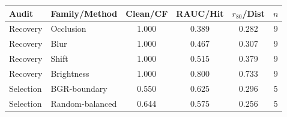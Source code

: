 \begin{tabular}{llcccc}
\hline
Audit & Family/Method & Clean/CF & RAUC/Hit & $r_{80}$/Dist & $n$ \\
\hline
Recovery & Occlusion & 1.000 & 0.389 & 0.282 & 9 \\
Recovery & Blur & 1.000 & 0.467 & 0.307 & 9 \\
Recovery & Shift & 1.000 & 0.515 & 0.379 & 9 \\
Recovery & Brightness & 1.000 & 0.800 & 0.733 & 9 \\
Selection & BGR-boundary & 0.550 & 0.625 & 0.296 & 5 \\
Selection & Random-balanced & 0.644 & 0.575 & 0.256 & 5 \\
\hline
\end{tabular}
